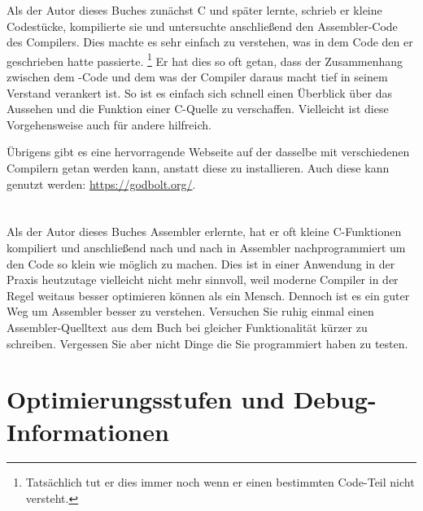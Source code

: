 
Als der Autor dieses Buches zunächst C und später \Cpp lernte, schrieb er kleine Codestücke, kompilierte sie und
untersuchte anschließend den Assembler-Code des Compilers. Dies machte es sehr einfach zu verstehen, was in dem Code
den er geschrieben hatte passierte.
\footnote{Tatsächlich tut er dies immer noch wenn er einen bestimmten Code-Teil nicht versteht.} 
Er hat dies so oft getan, dass der Zusammenhang zwischen dem \CCpp-Code und dem was der Compiler daraus macht tief in
seinem Verstand verankert ist. %
So ist es einfach sich schnell einen Überblick über das Aussehen und die Funktion einer C-Quelle zu verschaffen. 
Vielleicht ist diese Vorgehensweise auch für andere hilfreich.


Übrigens gibt es eine hervorragende Webseite auf der dasselbe mit verschiedenen
Compilern getan werden kann, anstatt diese zu installieren.
Auch diese kann genutzt werden: \url{https://godbolt.org/}.

\section*{\Exercises}

Als der Autor dieses Buches Assembler erlernte, hat er oft kleine C-Funktionen kompiliert und anschließend nach und nach in
Assembler nachprogrammiert um den Code so klein wie möglich zu machen.
Dies ist in einer Anwendung in der Praxis heutzutage vielleicht nicht mehr sinnvoll, weil moderne Compiler in der Regel weitaus
besser optimieren können als ein Mensch. Dennoch ist es ein guter Weg um Assembler besser zu verstehen. Versuchen Sie ruhig
einmal einen Assembler-Quelltext aus dem Buch bei gleicher Funktionalität kürzer zu schreiben.
Vergessen Sie aber nicht Dinge die Sie programmiert haben zu testen.

\section*{Optimierungsstufen und Debug-Informationen}

